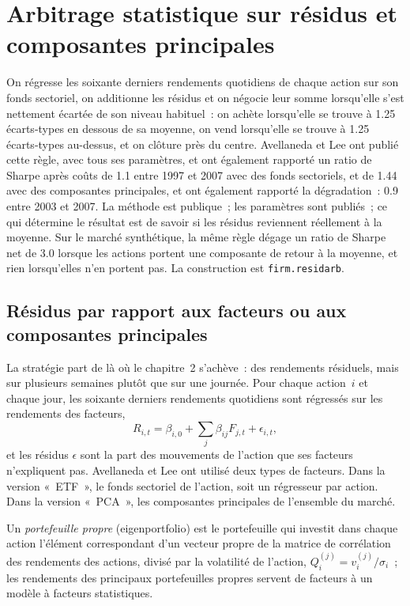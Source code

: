 \chapter{Arbitrage statistique sur résidus et composantes principales}\label{ch:s1:residual-and-principal-component-stat-arb}

On régresse les soixante derniers rendements quotidiens de chaque action sur son fonds sectoriel, on additionne les résidus et on négocie leur somme lorsqu'elle s'est nettement écartée de son niveau habituel~:
on achète lorsqu'elle se trouve à 1.25 écarts-types en dessous de sa moyenne, on vend lorsqu'elle se trouve à 1.25 écarts-types au-dessus, et on clôture près du centre. Avellaneda et Lee ont publié cette règle, avec tous ses
paramètres, et ont également rapporté un ratio de Sharpe après coûts de 1.1 entre 1997 et 2007 avec des fonds sectoriels, et de 1.44 avec des composantes principales, et ont également rapporté la
dégradation~: 0.9 entre 2003 et 2007. La méthode est publique~; les paramètres sont publiés~; ce qui détermine le résultat est de savoir si les résidus reviennent réellement à la moyenne.
Sur le marché synthétique, la même règle dégage un ratio de Sharpe net de 3.0 lorsque les actions portent une composante de retour à la moyenne, et rien lorsqu'elles n'en portent pas. La construction est
\texttt{firm.residarb}.

\section{Résidus par rapport aux facteurs ou aux composantes principales}

La stratégie part de là où le chapitre~2 s'achève~: des rendements résiduels, mais sur plusieurs semaines plutôt que sur une journée. Pour chaque action~$i$ et chaque jour, les soixante derniers
rendements quotidiens sont régressés sur les rendements des facteurs,
\[
R_{i,t} = \beta_{i,0} + \sum_j \beta_{ij} F_{j,t} + \epsilon_{i,t},
\]
et les résidus $\epsilon$ sont la part des mouvements de l'action que ses facteurs n'expliquent pas. Avellaneda et Lee ont utilisé deux types de facteurs. Dans la version «~ETF~»,
le fonds sectoriel de l'action, soit un régresseur par action. Dans la version «~PCA~», les composantes principales de l'ensemble du marché.

\begin{definition}\label{def:s1:residual-and-principal-component-stat-arb:eigenportfolio}
Un \emph{portefeuille propre} (eigenportfolio) est le portefeuille qui investit dans chaque action l'élément correspondant d'un vecteur propre de la matrice de corrélation des
rendements des actions, divisé par la volatilité de l'action, $Q^{(j)}_i = v^{(j)}_i/\sigma_i$~; les rendements des principaux portefeuilles propres servent de facteurs à un
modèle à facteurs statistiques.
\end{definition}

